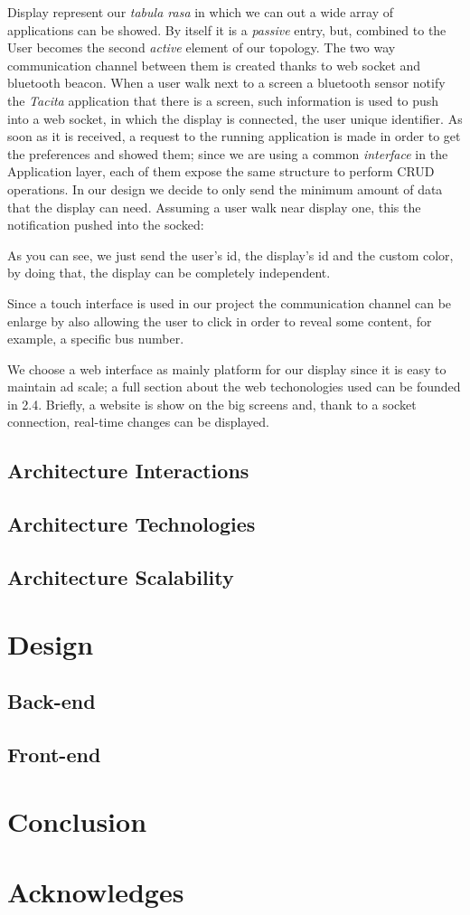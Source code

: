 \documentclass[]{usiinfbachelorproject}
\begin{document}
Display represent our \emph{tabula rasa} in which we can out a wide array of applications can be showed. By itself it is a \emph{passive} entry, but, combined to the User becomes the second \emph{active} element of our topology. The two way communication channel between them is created thanks to web socket and bluetooth beacon. When a user walk next to a screen a bluetooth sensor notify the \emph{Tacita} application that there is a screen, such information is used to push into a web socket, in which the display is connected, the user unique identifier. As soon as it is received, a request to the running application is made in order to get the preferences and showed them; since we are using a common \emph{interface} in the Application layer, each of them expose the same structure to perform CRUD operations.
In our design we decide to only send the minimum amount of data that the display can need. Assuming a user walk near display one, this the notification pushed into the socked:


As you can see, we just send the user's id, the display's id and the custom color, by doing that, the display can be completely independent.

Since a touch interface is used in our project the communication channel can be enlarge by also allowing the user to click in order to reveal some content, for example, a specific bus number.

 We choose a web interface as mainly platform for our display since it is easy to maintain ad  scale; a full section about the web techonologies used can be founded in 2.4. Briefly, a website is show on the big screens and, thank to a socket connection, real-time changes can be displayed.
\subsection{Architecture Interactions}
\subsection{Architecture Technologies}
\subsection{Architecture Scalability}
\section{Design}
\subsection{Back-end}
\subsection{Front-end}
\section{Conclusion}
\section{Acknowledges}

\newpage





\end{document}
